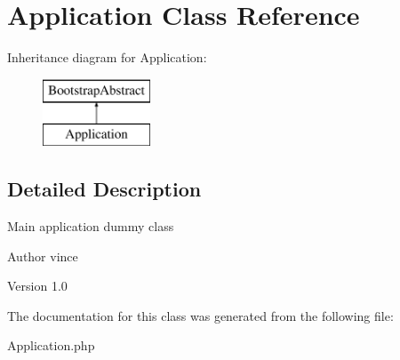 \hypertarget{class_anemo_1_1_application}{
\section{Application Class Reference}
\label{class_anemo_1_1_application}
}
Inheritance diagram for Application:\begin{figure}[H]
\begin{center}
\leavevmode
\includegraphics[height=2.000000cm]{class_anemo_1_1_application}
\end{center}
\end{figure}


\subsection{Detailed Description}
Main application dummy class \begin{DoxyAuthor}{Author}
vince 
\end{DoxyAuthor}
\begin{DoxyVersion}{Version}
1.0 
\end{DoxyVersion}


The documentation for this class was generated from the following file:\begin{DoxyCompactItemize}
\item 
Application.php\end{DoxyCompactItemize}
